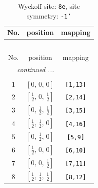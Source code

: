 \documentclass[fleqn,8pt]{jsarticle}
\begin{document}
\renewcommand{\arraystretch}{1.2}
\begin{longtable}{ccc}
\caption{Wyckoff site: {\tt 8e}, site symmetry: {\tt -1'}}
 \\
 \hline \hline
No. & position & mapping \\ \hline \endfirsthead

\multicolumn{2}{l}{\tablename\ \thetable{}} \\
 \hline \hline
No. & position & mapping \\ \hline \endhead

 \hline \hline
\multicolumn{2}{r}{\footnotesize\it continued ...} \\ \endfoot

 \hline \hline
\multicolumn{2}{r}{} \\ \endlastfoot

1 & $\left[ 0,\, 0,\, 0 \right]$ & {\tt [1,13]} \\ \hline
2 & $\left[ \frac{1}{2},\, 0,\, \frac{1}{2} \right]$ & {\tt [2,14]} \\ \hline
3 & $\left[ 0,\, \frac{1}{2},\, \frac{1}{2} \right]$ & {\tt [3,15]} \\ \hline
4 & $\left[ \frac{1}{2},\, \frac{1}{2},\, 0 \right]$ & {\tt [4,16]} \\ \hline
5 & $\left[ 0,\, \frac{1}{2},\, 0 \right]$ & {\tt [5,9]} \\ \hline
6 & $\left[ \frac{1}{2},\, 0,\, 0 \right]$ & {\tt [6,10]} \\ \hline
7 & $\left[ 0,\, 0,\, \frac{1}{2} \right]$ & {\tt [7,11]} \\ \hline
8 & $\left[ \frac{1}{2},\, \frac{1}{2},\, \frac{1}{2} \right]$ & {\tt [8,12]} \\
\end{longtable}
\renewcommand{\arraystretch}{1.2}
\end{document}
